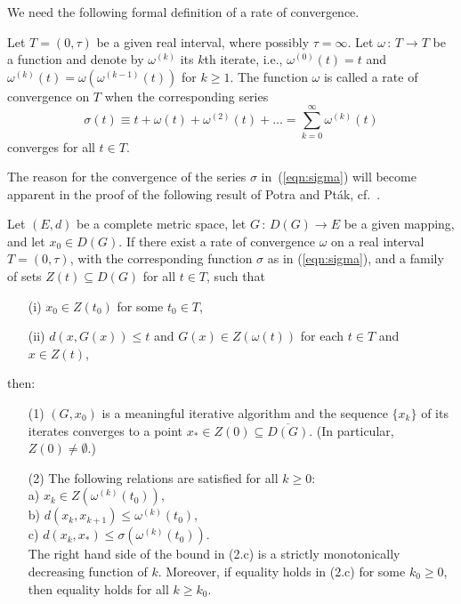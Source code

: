 \documentclass{siamltex}
\begin{document}
We need the following formal definition of a rate of convergence.

\medskip
\begin{definition}\label{def:rate}
Let $T=(0,\tau)$ be a given real interval, where possibly $\tau=\infty$. Let $\omega\,:\,T\rightarrow T$
be a function and denote by $\omega^{(k)}$ its $k$th iterate, i.e., $\omega^{(0)}(t)=t$ and
$\omega^{(k)}(t)=\omega(\omega^{(k-1)}(t))$ for $k\geq 1$. The function $\omega$ is called 
a rate of convergence on $T$ when the corresponding series
\begin{equation}\label{eqn:sigma}
\sigma(t)\equiv t+\omega(t)+\omega^{(2)}(t)+\dots = \sum_{k=0}^\infty \omega^{(k)}(t)
\end{equation}
converges for all $t\in T$.
\end{definition}

\medskip
The reason for the convergence of the series $\sigma$ in~(\ref{eqn:sigma}) will become apparent
in the proof of the following result of Potra and Pt\'ak, cf.~\cite[Proposition~1.9]{PotPtaBook84}.

\medskip
\begin{theorem}\label{thm:PotPta}
Let $(E,d)$ be a complete metric space, let $G\,:\,D(G)\rightarrow E$ be a given mapping, and
let $x_0\in D(G)$. If there exist a rate of convergence $\omega$ on a real interval $T=(0,\tau)$,
with the corresponding function $\sigma$ as in (\ref{eqn:sigma}), and a family of sets
$Z(t)\subseteq D(G)$ for all $t\in T$, such that
\begin{itemize}
\item[(i)] $x_0\in Z(t_0)$ for some $t_0\in T$,
\item[(ii)] $d(x,G(x))\leq t$ and $G(x)\in Z(\omega(t))$ for each $t\in T$ and $x\in Z(t)$,
\end{itemize}
then:
\begin{enumerate}
\item[(1)] $(G,x_0)$ is a meaningful iterative algorithm and the sequence $\{x_k\}$ of its iterates
converges to a point $x_*\in Z(0)\subseteq \overline{D(G)}$. (In particular, $Z(0)\neq \emptyset$.)
\item[(2)] The following relations are satisfied for all $k\geq 0$:\\
a) $x_k\in Z(\omega^{(k)}(t_0))$,\\
b) $d(x_k,x_{k+1})\leq \omega^{(k)}(t_0)$,\\
c) $d(x_k,x_*)\leq \sigma(\omega^{(k)}(t_0))$.\\
The right hand side of the bound in (2.c) is a strictly monotonically decreasing
function of $k$. Moreover, if equality holds in (2.c) for some $k_0\geq 0$, then
equality holds for all $k\geq k_0$.
\end{enumerate}
\end{theorem}
\end{document}
